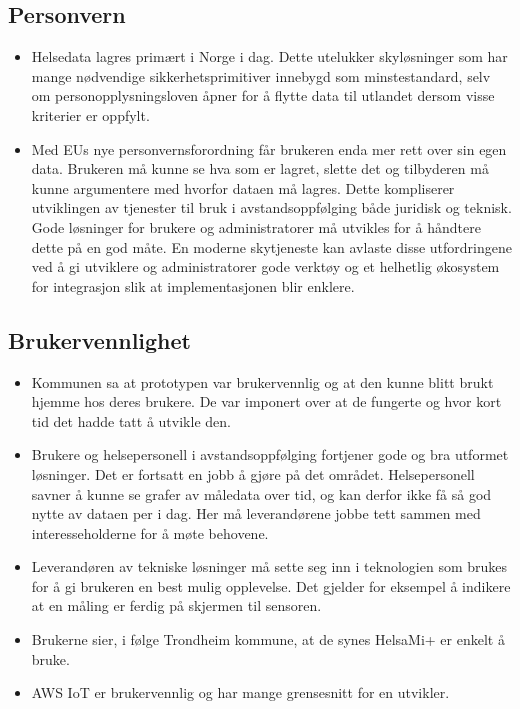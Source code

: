 \subsection{Personvern}
\begin{itemize}
  \item Helsedata lagres primært i Norge i dag. Dette utelukker skyløsninger
  som har mange nødvendige sikkerhetsprimitiver innebygd som minstestandard, selv
  om personopplysningsloven åpner for å flytte data til utlandet dersom visse kriterier er oppfylt.
  \item Med EUs nye personvernsforordning får brukeren enda mer rett over sin egen data.
  Brukeren må kunne se hva som er lagret, slette det og tilbyderen må kunne argumentere
  med hvorfor dataen må lagres. Dette kompliserer utviklingen av tjenester til bruk i avstandsoppfølging
  både juridisk og teknisk. Gode løsninger for brukere og administratorer må utvikles for å håndtere dette
  på en god måte. En moderne skytjeneste kan avlaste disse utfordringene ved å gi utviklere og administratorer
  gode verktøy og et helhetlig økosystem for integrasjon slik at implementasjonen blir enklere.
\end{itemize}

\subsection{Brukervennlighet}
\begin{itemize}
    \item Kommunen sa at prototypen var brukervennlig og at den kunne blitt brukt hjemme hos deres brukere. De var imponert over
        at de fungerte og hvor kort tid det hadde tatt å utvikle den.
    \item Brukere og helsepersonell i avstandsoppfølging fortjener gode og bra utformet løsninger. Det er fortsatt en jobb
        å gjøre på det området. Helsepersonell savner å kunne se grafer av måledata over tid, og kan derfor ikke få så god
        nytte av dataen per i dag. Her må leverandørene jobbe tett sammen med interesseholderne for å møte behovene.
    \item Leverandøren av tekniske løsninger må sette seg inn i teknologien som brukes for å gi brukeren en best mulig opplevelse.
        Det gjelder for eksempel å indikere at en måling er ferdig på skjermen til sensoren.
    \item Brukerne sier, i følge Trondheim kommune, at de synes HelsaMi+ er enkelt å bruke.
    \item AWS IoT er brukervennlig og har mange grensesnitt for en utvikler.
\end{itemize}

